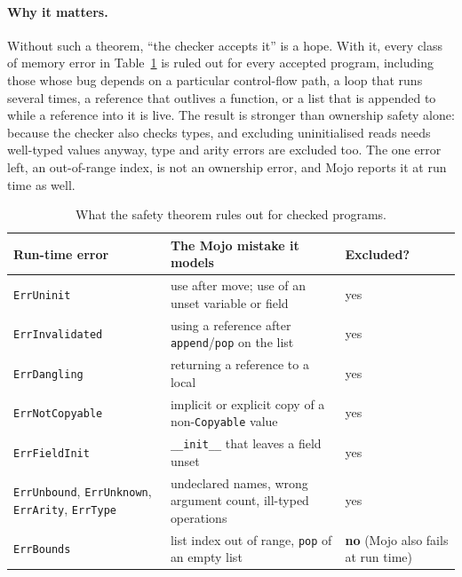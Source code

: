 \documentclass[11pt,a4paper]{article}
\newcommand{\code}[1]{\texttt{#1}}
\begin{document}
\paragraph{Why it matters.}
Without such a theorem, ``the checker accepts it'' is a hope. With it, every
class of memory error in Table~\ref{tab:errors} is ruled out for every accepted
program, including those whose bug depends on a particular control-flow path, a
loop that runs several times, a reference that outlives a function, or a list
that is appended to while a reference into it is live. The result is stronger
than ownership safety alone: because the checker also checks types, and excluding
uninitialised reads needs well-typed values anyway, type and arity errors are
excluded too. The one error left, an out-of-range index, is not an ownership
error, and Mojo reports it at run time as well.

\begin{table}[t]
\centering\small
\begin{tabular}{@{}lp{6.2cm}p{2.7cm}@{}}
\toprule
Run-time error & The Mojo mistake it models & Excluded?\\
\midrule
\code{ErrUninit} & use after move; use of an unset variable or field & yes\\
\code{ErrInvalidated} & using a reference after \code{append}/\code{pop} on the list & yes\\
\code{ErrDangling} & returning a reference to a local & yes\\
\code{ErrNotCopyable} & implicit or explicit copy of a non-\code{Copyable} value & yes\\
\code{ErrFieldInit} & \code{\_\_init\_\_} that leaves a field unset & yes\\
\code{ErrUnbound}, \code{ErrUnknown}, \code{ErrArity}, \code{ErrType} & undeclared names, wrong argument count, ill-typed operations & yes\\
\code{ErrBounds} & list index out of range, \code{pop} of an empty list & \textbf{no} (Mojo also fails at run time)\\
\bottomrule
\end{tabular}
\caption{What the safety theorem rules out for checked programs.}
\label{tab:errors}
\end{table}
\end{document}
